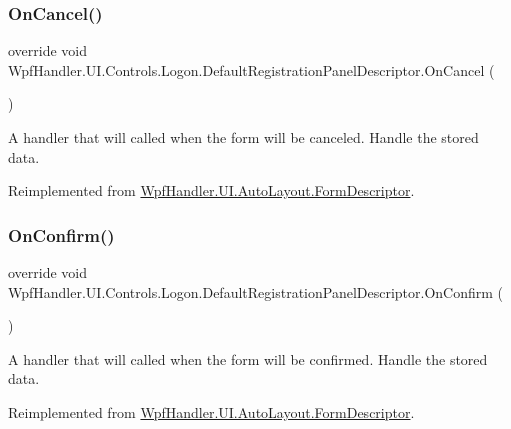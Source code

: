 \subsubsection{\texorpdfstring{On\+Cancel()}{OnCancel()}}
{\footnotesize\ttfamily override void Wpf\+Handler.\+U\+I.\+Controls.\+Logon.\+Default\+Registration\+Panel\+Descriptor.\+On\+Cancel (\begin{DoxyParamCaption}{ }\end{DoxyParamCaption})\hspace{0.3cm}{\ttfamily [virtual]}}



A handler that will called when the form will be canceled. Handle the stored data. 



Reimplemented from \mbox{\hyperlink{class_wpf_handler_1_1_u_i_1_1_auto_layout_1_1_form_descriptor_a4bbe131238be232c253ca4c65e8493f4}{Wpf\+Handler.\+U\+I.\+Auto\+Layout.\+Form\+Descriptor}}.

\mbox{\label{class_wpf_handler_1_1_u_i_1_1_controls_1_1_logon_1_1_default_registration_panel_descriptor_aee1e6b6ba9214aac4a82b0213e4d3442}} 
\subsubsection{\texorpdfstring{On\+Confirm()}{OnConfirm()}}
{\footnotesize\ttfamily override void Wpf\+Handler.\+U\+I.\+Controls.\+Logon.\+Default\+Registration\+Panel\+Descriptor.\+On\+Confirm (\begin{DoxyParamCaption}{ }\end{DoxyParamCaption})\hspace{0.3cm}{\ttfamily [virtual]}}



A handler that will called when the form will be confirmed. Handle the stored data. 



Reimplemented from \mbox{\hyperlink{class_wpf_handler_1_1_u_i_1_1_auto_layout_1_1_form_descriptor_ae2d4791e3085dba435c09b6082bd8408}{Wpf\+Handler.\+U\+I.\+Auto\+Layout.\+Form\+Descriptor}}.

